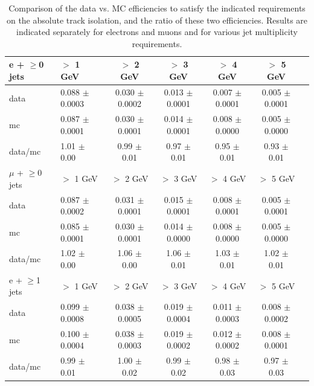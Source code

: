 \begin{table}[!ht]
\begin{center}
\caption{\label{tab:isotrk} Comparison of the data vs. MC efficiencies to satisfy the indicated requirements
on the absolute track isolation, and the ratio of these two efficiencies. Results are indicated separately for electrons and muons and for various
jet multiplicity requirements.}
\begin{tabular}{l|l|c|c|c|c|c}
\hline
\hline
 e + $\geq$0 jets            &           $>$ 1 GeV   &           $>$ 2 GeV   &           $>$ 3 GeV   &           $>$ 4 GeV   &           $>$ 5 GeV  \\
\hline
      data   &  0.088 $\pm$ 0.0003   &  0.030 $\pm$ 0.0002   &  0.013 $\pm$ 0.0001   &  0.007 $\pm$ 0.0001   &  0.005 $\pm$ 0.0001  \\
        mc   &  0.087 $\pm$ 0.0001   &  0.030 $\pm$ 0.0001   &  0.014 $\pm$ 0.0001   &  0.008 $\pm$ 0.0000   &  0.005 $\pm$ 0.0000  \\
   data/mc   &     1.01 $\pm$ 0.00   &     0.99 $\pm$ 0.01   &     0.97 $\pm$ 0.01   &     0.95 $\pm$ 0.01   &     0.93 $\pm$ 0.01  \\
\hline
\hline
 $\mu$ + $\geq$0 jets            &           $>$ 1 GeV   &           $>$ 2 GeV   &           $>$ 3 GeV   &           $>$ 4 GeV   &           $>$ 5 GeV  \\
\hline
      data   &  0.087 $\pm$ 0.0002   &  0.031 $\pm$ 0.0001   &  0.015 $\pm$ 0.0001   &  0.008 $\pm$ 0.0001   &  0.005 $\pm$ 0.0001  \\
        mc   &  0.085 $\pm$ 0.0001   &  0.030 $\pm$ 0.0001   &  0.014 $\pm$ 0.0000   &  0.008 $\pm$ 0.0000   &  0.005 $\pm$ 0.0000  \\
   data/mc   &     1.02 $\pm$ 0.00   &     1.06 $\pm$ 0.00   &     1.06 $\pm$ 0.01   &     1.03 $\pm$ 0.01   &     1.02 $\pm$ 0.01  \\
\hline
\hline 
 e + $\geq$1 jets            &           $>$ 1 GeV   &           $>$ 2 GeV   &           $>$ 3 GeV   &           $>$ 4 GeV   &           $>$ 5 GeV  \\
\hline
      data   &  0.099 $\pm$ 0.0008   &  0.038 $\pm$ 0.0005   &  0.019 $\pm$ 0.0004   &  0.011 $\pm$ 0.0003   &  0.008 $\pm$ 0.0002  \\
        mc   &  0.100 $\pm$ 0.0004   &  0.038 $\pm$ 0.0003   &  0.019 $\pm$ 0.0002   &  0.012 $\pm$ 0.0002   &  0.008 $\pm$ 0.0001  \\
   data/mc   &     0.99 $\pm$ 0.01   &     1.00 $\pm$ 0.02   &     0.99 $\pm$ 0.02   &     0.98 $\pm$ 0.03   &     0.97 $\pm$ 0.03  \\

\end{tabular}
\end{center}
\end{table}
